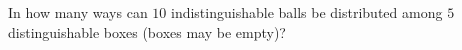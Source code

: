 In how many ways can $10$ indistinguishable balls be distributed among $5$ distinguishable boxes (boxes may be empty)?
